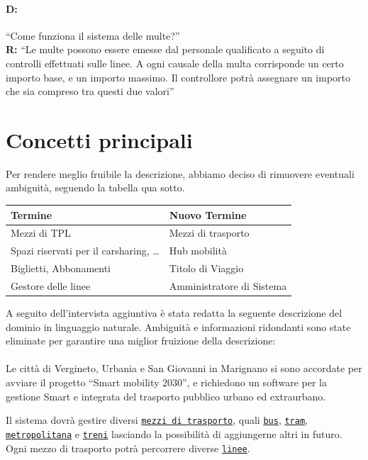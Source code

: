 \documentclass[12pt,a4paper]{report}
\begin{document}
\paragraph{D:}
“Come funziona il sistema delle multe?”
\\ {\bf R:} “Le multe possono essere emesse dal personale qualificato a seguito di controlli effettuati sulle linee.
A ogni causale della multa corrisponde un certo importo base, e un importo massimo. Il controllore potrà assegnare un importo che sia compreso tra questi due valori”


\section{Concetti principali}
Per rendere meglio fruibile la descrizione, abbiamo deciso di rimuovere eventuali ambiguità, seguendo la tabella qua sotto.

\begin{table}[h!]
\begin{tabular}{|l|l|}
\hline
\textbf{Termine} & \textbf{Nuovo Termine} \\
\hline
Mezzi di TPL & Mezzi di trasporto \\
Spazi riservati per il carsharing, … & Hub mobilità \\
Biglietti, Abbonamenti & Titolo di Viaggio \\
Gestore delle linee & Amministratore di Sistema \\
\hline
\end{tabular}
\end{table}

A seguito dell’intervista aggiuntiva è stata redatta la seguente descrizione del dominio in linguaggio naturale. Ambiguità e informazioni ridondanti sono state eliminate per garantire una miglior fruizione della descrizione:
\\ \\
Le città di Vergineto, Urbania e San Giovanni in Marignano si sono accordate per avviare il progetto “Smart mobility 2030”, e richiedono un software per la gestione Smart e integrata del trasporto pubblico urbano ed extraurbano.

Il sistema dovrà gestire diversi \underline{\texttt{mezzi di trasporto}}, quali \underline{\texttt{bus}}, \underline{\texttt{tram}}, \underline{\texttt{metropolitana}} e \underline{\texttt{treni}} lasciando la possibilità di aggiungerne altri in futuro. Ogni mezzo di trasporto potrà percorrere diverse \underline{\texttt{linee}}.
\end{document}
